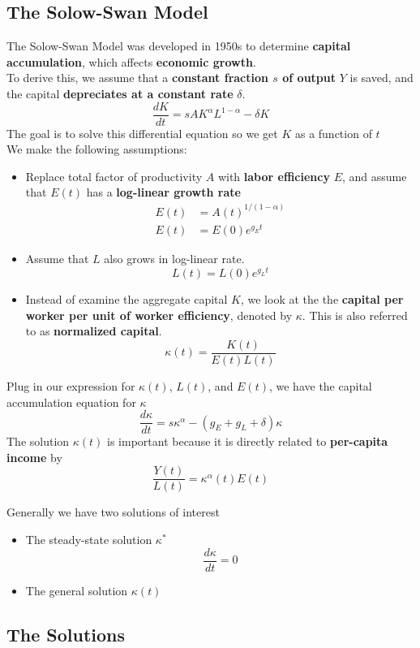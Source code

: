 \documentclass[a4paper]{article}
\renewcommand{\sb}{\vspace*{4px} \\}
\begin{document}
\subsection{The Solow-Swan Model}
The Solow-Swan Model was developed in 1950s to determine \textbf{capital accumulation}, which affects \textbf{economic growth}. \sb
To derive this, we assume that a \textbf{constant fraction $s$ of output} $Y$ is saved, and the capital \textbf{depreciates at a constant rate} $\delta$.
\begin{equation}
    \tag{Capital Accumulation Equation}
    \frac{dK}{dt} = sAK^{\alpha}L^{1-\alpha} - \delta K
\end{equation}
The goal is to solve this differential equation so we get $K$ as a function of $t$ \sb
We make the following assumptions: \begin{itemize}
    \item Replace total factor of productivity $A$ with \textbf{labor efficiency} $E$, and assume that $E(t)$ has a \textbf{log-linear growth rate}
    \begin{align*}
        E(t) &= A(t)^{1/(1-\alpha)} \\
        E(t) &= E(0)e^{g_E t}
    \end{align*}
    \item Assume that $L$ also grows in log-linear rate.
    \[ L(t) = L(0)e^{g_L t} \]
    \item Instead of examine the aggregate capital $K$, we look at the the \textbf{capital per worker per unit of worker efficiency}, denoted by $\kappa$. This 
    is also referred to as \textbf{normalized capital}.
    \[ \kappa(t) = \frac{K(t)}{E(t)L(t)} \]
\end{itemize}
Plug in our expression for $\kappa(t)$, $L(t)$, and $E(t)$, we have the capital accumulation equation for $\kappa$
\[ \frac{d\kappa}{dt} = s\kappa^\alpha - (g_E + g_L + \delta)\kappa \]
The solution $\kappa(t)$ is important because it is directly related to \textbf{per-capita income} by
\[ \frac{Y(t)}{L(t)} = \kappa^\alpha(t)E(t) \]

Generally we have two solutions of interest
\begin{itemize}
    \item The steady-state solution $\kappa^*$
    \[ \frac{d\kappa}{dt} = 0 \]
    \item The general solution $\kappa(t)$
\end{itemize}


\subsection{The Solutions}
\end{document}
